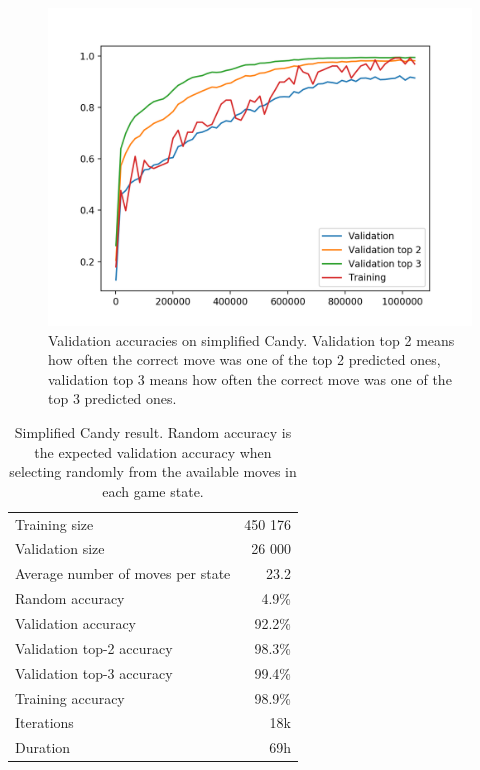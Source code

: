 \documentclass{kththesis}
\begin{document}
\begin{figure}[!htb]
\centering
\includegraphics[width=\textwidth]{images/candy_small_validation.png}
\caption{Validation accuracies on simplified Candy. Validation top 2 means how often the correct move was one of the top 2 predicted ones, validation top 3 means how often the correct move was one of the top 3 predicted ones.}
\label{fig:candy_small_validation_accuracy}
\end{figure}

\begin{table}
\caption{Simplified Candy result. Random accuracy is the expected validation accuracy when selecting randomly from the available moves in each game state.}
\centering
\begin{tabular}{ l | r }
\hline
Training size & 450 176\\
Validation size & 26 000\\
Average number of moves per state & 23.2 \\
Random accuracy & 4.9\% \\
Validation accuracy & 92.2\% \\
Validation top-2 accuracy & 98.3\% \\
Validation top-3 accuracy & 99.4\% \\
Training accuracy & 98.9\% \\
Iterations & 18k \\
Duration & 69h \\
\hline
\end{tabular}
\end{table}
\end{document}
